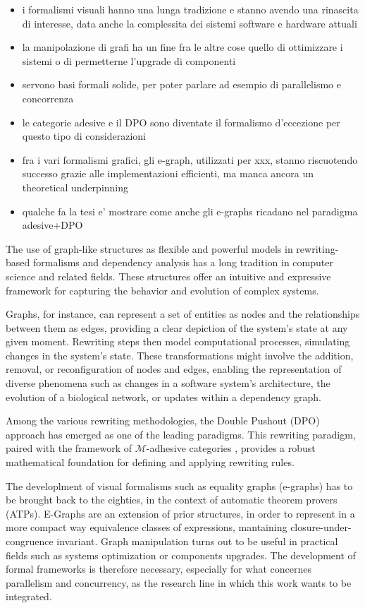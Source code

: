 \begin{itemize}
\item i formalismi visuali hanno una lunga tradizione e stanno avendo una rinascita di interesse, data anche la complessita dei sistemi software e hardware attuali
\item la manipolazione di grafi ha un fine fra le altre cose quello di ottimizzare i sistemi o di permetterne l'upgrade di componenti
\item servono basi formali solide, per poter parlare ad esempio di parallelismo e concorrenza
\item le categorie adesive e il DPO sono diventate il formalismo d'eccezione per questo tipo di considerazioni
\item fra i vari formalismi grafici, gli e-graph, utilizzati per xxx, stanno riscuotendo successo grazie alle implementazioni efficienti, ma manca ancora un theoretical underpinning
\item qualche fa la tesi e' mostrare come anche gli e-graphs ricadano nel paradigma adesive+DPO
\end{itemize}

\fi

The use of graph-like structures as flexible and powerful models in rewriting-based formalisms and dependency analysis has a long tradition in computer science and related fields. These structures offer an intuitive and expressive framework for capturing the behavior and evolution of complex systems.

Graphs, for instance, can represent a set of entities as nodes and the relationships between them as edges, providing a clear depiction of the system's state at any given moment. Rewriting steps then model computational processes, simulating changes in the system’s state. These transformations might involve the addition, removal, or reconfiguration of nodes and edges, enabling the representation of diverse phenomena such as changes in a software system's architecture, the evolution of a biological network, or updates within a dependency graph. 

Among the various rewriting methodologies, the Double Pushout (DPO) approach \cite{Ehrig_Golas,ehrig2006fundamentals}has emerged as one of the leading paradigms. This rewriting paradigm, paired with the framework of $\mathcal{M}$-adhesive  categories \cite{lack2005adhesive,azzi2019essence,behr2022fundamentals}, provides a robust mathematical foundation for defining and applying rewriting rules. 


The developlment of visual formalisms such as equality graphs (e-graphs) has to be brought back to the eighties, in the context of automatic theorem provers (ATPs).
E-Graphs are an extension of prior structures, in order to represent in a more compact way equivalence classes of expressions, mantaining closure-under-congruence invariant.
Graph manipulation turns out to be useful in practical fields such as systems optimization or components upgrades.
The development of formal frameworks is therefore necessary, especially for what concernes parallelism and concurrency, as the research line in which this work wants to be integrated.


